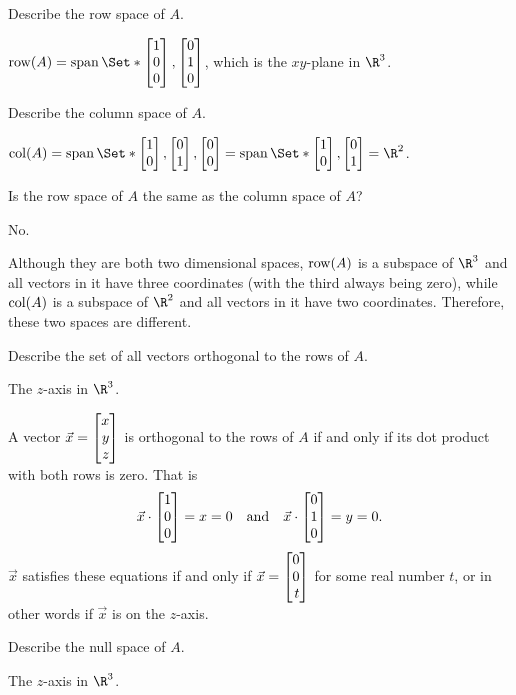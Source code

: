 	\begin{parts}
		\item Describe the row space of $A$.
			\begin{solution}
				$\Row(A) = \Span\Set*{\mat{1\\0\\0},\mat{0\\1\\0}}$,
				which is the $xy$-plane in $\R^3$.
			\end{solution}
		\item Describe the column space of $A$.
			\begin{solution}
				$\Col(A)=\Span\Set*{\mat{1\\0},\mat{0\\1},\mat{0\\0}}
					=\Span\Set*{\mat{1\\0},\mat{0\\1}}=\R^2$.
			\end{solution}
		\item Is the row space of $A$ the same as the column space of $A$?
			\begin{solution}
				No.

				Although they are both two dimensional spaces, $\operatorname{row}(A)$ is a
				subspace of $\R^3$ and all vectors in it have three coordinates
				(with the third always being zero), while $\operatorname{col}(A)$ is a
				subspace of $\R^2$ and all vectors in it have two coordinates.
				Therefore, these two spaces are different.
			\end{solution}
		\item Describe the set of all vectors orthogonal to the rows of $A$.
			\begin{solution}
				The $z$-axis in $\R^3$.

				A vector $\vec x=\mat{x\\y\\z}$ is orthogonal to the rows of $A$
				if and only if its dot product with both rows is zero. That is
				\[
					\vec x\cdot\mat{1\\0\\0} = x = 0
					\quad \text{and} \quad
					\vec x\cdot\mat{0\\1\\0} = y = 0.
				\]
				$\vec x$ satisfies these equations if and only if $\vec x=\mat{0\\0\\t}$
				for some real number $t$, or in other words if $\vec x$ is on the
				$z$-axis.
			\end{solution}
		\item Describe the null space of $A$.
			\begin{solution}
				The $z$-axis in $\R^3$.


\end{solution}
\end{parts}
